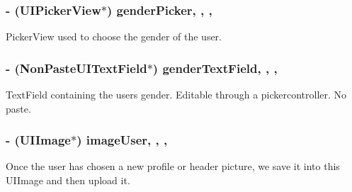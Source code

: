 \subsubsection[{gender\+Picker}]{\setlength{\rightskip}{0pt plus 5cm}-\/ (U\+I\+Picker\+View$\ast$) gender\+Picker\hspace{0.3cm}{\ttfamily [read]}, {\ttfamily [write]}, {\ttfamily [nonatomic]}, {\ttfamily [strong]}}\label{interface_e_s_edit_profile_view_controller_a8bd2fcffae0d056383f32f204826874e}
Picker\+View used to choose the gender of the user. \hypertarget{interface_e_s_edit_profile_view_controller_a05b914950b0d2a24ba35969e928e0360}{}
\subsubsection[{gender\+Text\+Field}]{\setlength{\rightskip}{0pt plus 5cm}-\/ ({\bf Non\+Paste\+U\+I\+Text\+Field}$\ast$) gender\+Text\+Field\hspace{0.3cm}{\ttfamily [read]}, {\ttfamily [write]}, {\ttfamily [nonatomic]}, {\ttfamily [strong]}}\label{interface_e_s_edit_profile_view_controller_a05b914950b0d2a24ba35969e928e0360}
Text\+Field containing the user\textquotesingle{}s gender. Editable through a pickercontroller. No paste. \hypertarget{interface_e_s_edit_profile_view_controller_a5ddc85314a3896fa0585c78abe79ae93}{}
\subsubsection[{image\+User}]{\setlength{\rightskip}{0pt plus 5cm}-\/ (U\+I\+Image$\ast$) image\+User\hspace{0.3cm}{\ttfamily [read]}, {\ttfamily [write]}, {\ttfamily [nonatomic]}, {\ttfamily [strong]}}\label{interface_e_s_edit_profile_view_controller_a5ddc85314a3896fa0585c78abe79ae93}
Once the user has chosen a new profile or header picture, we save it into this U\+I\+Image and then upload it. \hypertarget{interface_e_s_edit_profile_view_controller_ab454426b9cc4c42437e9a484a7bc12b1}{}

